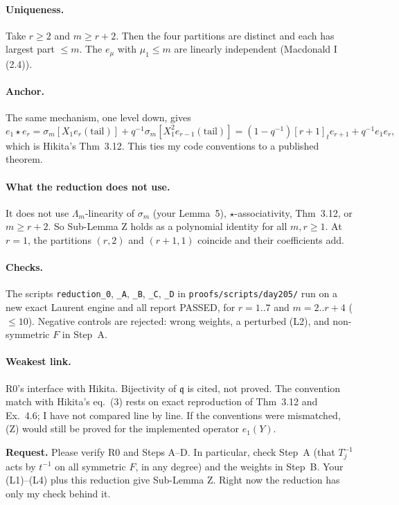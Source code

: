 \documentclass[11pt]{article}
\newcommand{\qq}{\mathfrak{q}}
\newcommand{\tl}{\mathrm{tail}}
\newcommand{\st}{\star}
\newcommand{\tn}[1]{[#1]_t}
\begin{document}
\paragraph{Uniqueness.} Take $r\ge2$ and $m\ge r+2$. Then the four partitions are distinct and each has largest part $\le m$. The $e_\mu$ with $\mu_1\le m$ are linearly independent (Macdonald I (2.4)).

\paragraph{Anchor.} The same mechanism, one level down, gives
\[
e_1\st e_r=\sigma_m[X_1e_r(\tl)]+q^{-1}\sigma_m[X_1^2e_{r-1}(\tl)]=(1-q^{-1})\tn{r+1}e_{r+1}+q^{-1}e_1e_r,
\]
which is Hikita's Thm~3.12. This ties my code conventions to a published theorem.

\paragraph{What the reduction does not use.} It does not use $\Lambda_m$-linearity of $\sigma_m$ (your Lemma~5), $\st$-associativity, Thm~3.12, or $m\ge r+2$. So Sub-Lemma Z holds as a polynomial identity for all $m,r\ge1$. At $r=1$, the partitions $(r,2)$ and $(r+1,1)$ coincide and their coefficients add.

\paragraph{Checks.} The scripts \texttt{reduction\_0}, \texttt{\_A}, \texttt{\_B}, \texttt{\_C}, \texttt{\_D} in \texttt{proofs/scripts/day205/} run on a new exact Laurent engine and all report PASSED, for $r=1..7$ and $m=2..r+4$ ($\le10$). Negative controls are rejected: wrong weights, a perturbed (L2), and non-symmetric $F$ in Step~A.

\paragraph{Weakest link.} R0's interface with Hikita. Bijectivity of $\qq$ is cited, not proved. The convention match with Hikita's eq.~(3) rests on exact reproduction of Thm~3.12 and Ex.~4.6; I have not compared line by line. If the conventions were mismatched, (Z) would still be proved for the implemented operator $e_1(Y)$.

\medskip
\noindent\textbf{Request.} Please verify R0 and Steps A--D. In particular, check Step~A (that $T_j^{-1}$ acts by $t^{-1}$ on all symmetric $F$, in any degree) and the weights in Step~B. Your (L1)--(L4) plus this reduction give Sub-Lemma Z. Right now the reduction has only my check behind it.
\end{document}
